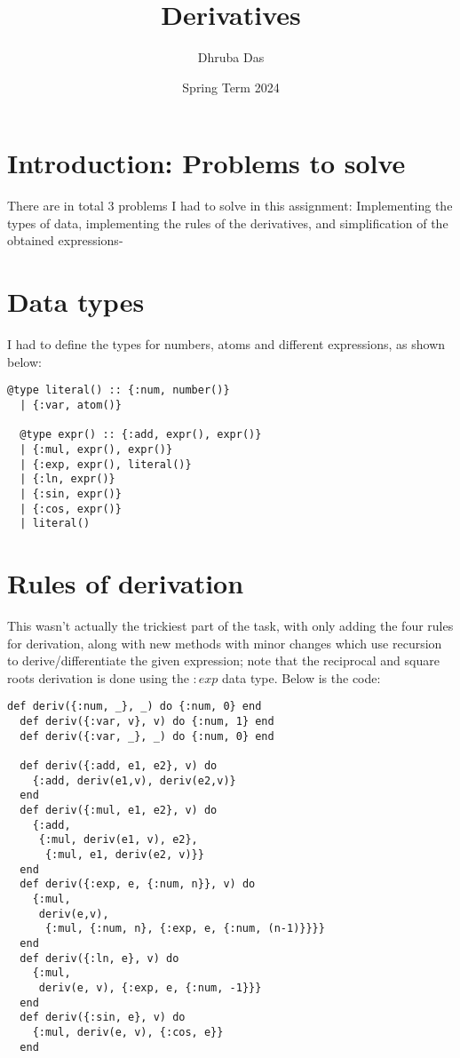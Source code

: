 \documentclass[a4paper,11pt]{article}
\begin{document}
\title{
    \textbf{Derivatives}
}
\author{Dhruba Das}
\date{Spring Term 2024}

\maketitle

\section*{Introduction: Problems to solve}

There are in total 3 problems I had to solve in this assignment: Implementing the types of data, implementing the rules of the derivatives,  and simplification of the obtained expressions-

\section*{Data types}

I had to define the types for numbers, atoms and different expressions, as shown below:

\begin{verbatim}
@type literal() :: {:num, number()} 
  | {:var, atom()}
  
  @type expr() :: {:add, expr(), expr()}
  | {:mul, expr(), expr()}
  | {:exp, expr(), literal()}
  | {:ln, expr()}
  | {:sin, expr()}
  | {:cos, expr()}
  | literal()
\end{verbatim}

\section*{Rules of derivation}
This wasn't actually the trickiest part of the task, with only adding the four rules for derivation, along with new methods with minor changes which use recursion to derive/differentiate the given expression; note that the reciprocal and square roots derivation is done using the $:exp$ data type. Below is the code:

\begin{verbatim}
def deriv({:num, _}, _) do {:num, 0} end
  def deriv({:var, v}, v) do {:num, 1} end
  def deriv({:var, _}, _) do {:num, 0} end
  
  def deriv({:add, e1, e2}, v) do
    {:add, deriv(e1,v), deriv(e2,v)}
  end
  def deriv({:mul, e1, e2}, v) do
    {:add, 
     {:mul, deriv(e1, v), e2},
      {:mul, e1, deriv(e2, v)}}
  end
  def deriv({:exp, e, {:num, n}}, v) do 
    {:mul,
     deriv(e,v),
      {:mul, {:num, n}, {:exp, e, {:num, (n-1)}}}}
  end
  def deriv({:ln, e}, v) do
    {:mul,
     deriv(e, v), {:exp, e, {:num, -1}}}
  end
  def deriv({:sin, e}, v) do
    {:mul, deriv(e, v), {:cos, e}}
  end
\end{verbatim}
\end{document}
